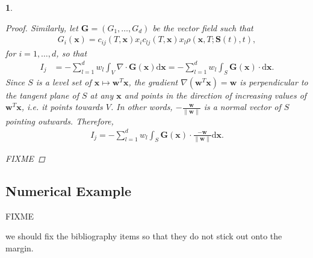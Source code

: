 \documentclass[english]{article}
\newcommand{\comment}[1]{\color{blue}#1\color{black}}
\numberwithin{equation}{section}
\numberwithin{figure}{section}
\theoremstyle{bolddescit}
\newtheorem{theorem}{\protect\theoremname}[section]
\theoremstyle{definition}
\theoremstyle{definition}
\theoremstyle{plain}
\theoremstyle{plain}
\theoremstyle{bolddesc}
\theoremstyle{plain}
\theoremstyle{remark}
\providecommand{\theoremname}{Theorem}
\begin{document}
\begin{theorem}
\begin{proof}
    Similarly, let $\mathbf{G} = (G_1,\ldots,G_d)$ be the vector field such that
    \begin{align*}
      G_i(\mathbf{x}) = c_{ij}(T,\mathbf{x}) x_i c_{lj}(T,\mathbf{x}) x_l \rho(\mathbf{x},T;\mathbf{S}(t),t),
    \end{align*}
    for $i=1,\ldots,d$, so that
    \begin{align*}
      I_j
      &= - \sum_{l=1}^{d} w_l \int_V \nabla \cdot \mathbf{G}(\mathbf{x}) \mathrm{d}\mathbf{x}
      = - \sum_{l=1}^{d} w_l \int_S \mathbf{G}(\mathbf{x}) \cdot \mathrm{d}\mathbf{x}.
    \end{align*}
    Since $S$ is a level set of $\mathbf{x} \mapsto \mathbf{w}^T \mathbf{x}$, the gradient $\nabla (\mathbf{w}^T \mathbf{x}) = \mathbf{w}$ is perpendicular to the tangent plane of $S$ at any $\mathbf{x}$ and points in the direction of increasing values of $\mathbf{w}^T \mathbf{x}$, i.e. it points towards $V$. In other words, $- \frac{\mathbf{w}}{\|\mathbf{w}\|}$ is a normal vector of $S$ pointing outwards. Therefore,
    \begin{align*}
      I_j
      = - \sum_{l=1}^{d} w_l \int_S \mathbf{G}(\mathbf{x}) \cdot \frac{-\mathbf{w}}{\|\mathbf{w}\|} \mathrm{d}\mathbf{x}.
    \end{align*}

    FIXME
  \end{proof}
\end{theorem}

\subsection{Numerical Example}


FIXME

\comment{we should fix the bibliography items so that they do not stick out onto the margin.}

\pagebreak
\printbibliography
\end{document}
